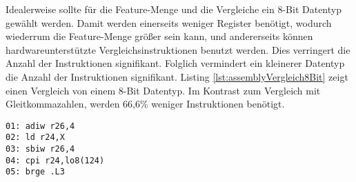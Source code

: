 Idealerweise sollte für die Feature-Menge und die Vergleiche ein 8-Bit Datentyp gewählt werden. Damit werden einerseits weniger Register benötigt, wodurch wiederrum die Feature-Menge größer sein kann,
und andererseits können hardwareunterstützte Vergleichsinstruktionen benutzt werden. Dies verringert die Anzahl der Instruktionen signifikant. Folglich vermindert ein kleinerer Datentyp die Anzahl der
Instruktionen signifikant. Listing \ref{lst:assemblyVergleich8Bit} zeigt einen Vergleich von einem 8-Bit Datentyp. Im Kontrast zum Vergleich mit Gleitkommazahlen, werden 66,6\% weniger Instruktionen
benötigt.
\begin{lstlisting}[label=lst:assemblyVergleich8Bit,caption={Vergleich von 8-Bit Feature mit konstanter 8-Bit Zahl.}]
01: adiw r26,4
02: ld r24,X
03: sbiw r26,4
04: cpi r24,lo8(124)
05: brge .L3
\end{lstlisting}